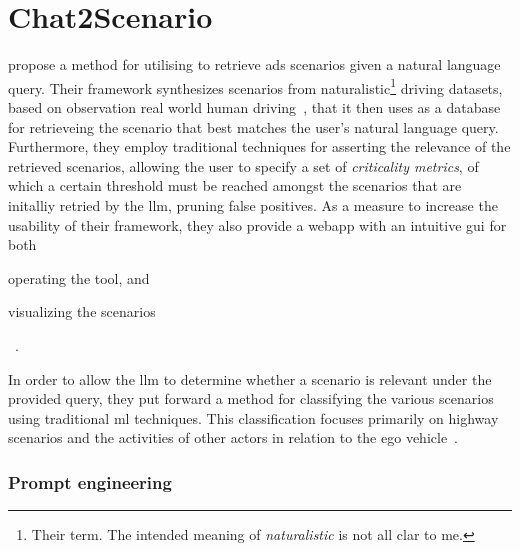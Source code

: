 \section{Chat2Scenario}

\citeauthor{chat2Scenario} propose a method for utilising  to retrieve
\acrshort{ads} scenarios given a natural language query. Their framework synthesizes scenarios from
naturalistic\footnote{Their term. The intended meaning of \textit{naturalistic} is not all clar to
  me.} driving datasets, based on observation real world human driving~\cite[55]{chat2Scenario}, that
it then uses as a database for retrieveing the scenario that best matches the user's natural
language query. Furthermore, they employ traditional techniques for asserting the relevance of the
retrieved scenarios, allowing the user to specify a set of \textit{criticality metrics}, of which a
certain threshold must be reached amongst the scenarios that are initalliy retried by the
\acrshort{llm}, pruning false positives. As a measure to increase the usability of their framework,
they also provide a webapp with an intuitive \acrshort{gui} for both \begin{inparaenum}
  \item operating the tool, and
  \item visualizing the scenarios \end{inparaenum}~\cite[560]{chat2Scenario}.

In order to allow the \acrshort{llm} to determine whether a scenario is relevant under the
provided query, they put forward a method for classifying the various scenarios using traditional
\acrshort{ml} techniques. This classification focuses primarily on highway scenarios and the
activities of other actors in relation to the ego vehicle~\cite[561-562]{chat2Scenario}.

\subsubsection*{Prompt engineering}


